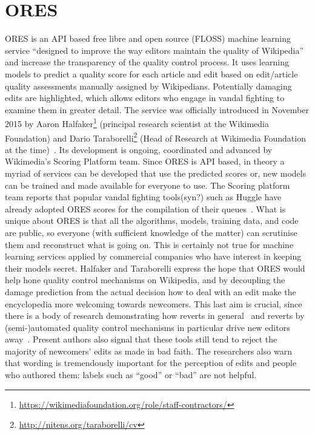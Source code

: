 \section{ORES}

ORES is an API based free libre and open source (FLOSS) machine learning service ``designed to improve the way editors maintain the quality of Wikipedia''~\cite{HalTar2015} and increase the transparency of the quality control process.
It uses learning models to predict a quality score for each article and edit based on edit/article quality assessments manually assigned by Wikipedians.
Potentially damaging edits are highlighted, which allows editors who engage in vandal fighting to examine them in greater detail.
The service was officially introduced in November 2015 by Aaron Halfaker\footnote{\url{https://wikimediafoundation.org/role/staff-contractors/}} (principal research scientist at the Wikimedia Foundation) and Dario Taraborelli\footnote{\url{http://nitens.org/taraborelli/cv}} (Head of Research at Wikimedia Foundation at the time)~\cite{HalTar2015}.
Its development is ongoing, coordinated and advanced by Wikimedia's Scoring Platform team.
Since ORES is API based, in theory a myriad of services can be developed that use the predicted scores or, new models can be trained and made available for everyone to use.
The Scoring platform team reports that popular vandal fighting tools(syn?) such as Huggle have already adopted ORES scores for the compilation of their queues~\cite{HalTar2015}.
What is unique about ORES is that all the algorithms, models, training data, and code are public, so everyone (with sufficient knowledge of the matter) can scrutinise them and reconstruct what is going on.
This is certainly not true for machine learning services applied by commercial companies who have interest in keeping their models secret.
Halfaker and Taraborelli express the hope that ORES would help hone quality control mechanisms on Wikipedia, and by decoupling the damage prediction from the actual decision how to deal with an edit make the encyclopedia more welcoming towards newcomers.
This last aim is crucial, since there is a body of research demonstrating how reverts in general~\cite{HalKitRied2011} and reverts by (semi-)automated quality control mechanisms in particular drive new editors away~\cite{HalGeiMorRied2013}.
Present authors also signal that these tools still tend to reject the majority of newcomers' edits as made in bad faith.
The researchers also warn that wording is tremendously important for the perception of edits and people who authored them: labels such as ``good'' or ``bad'' are not helpful.

